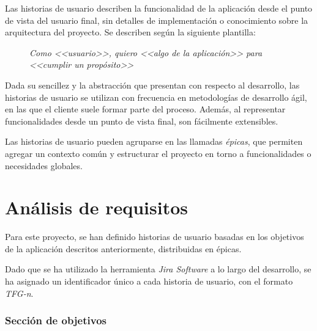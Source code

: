 \documentclass[10pt, a4paper]{aqademic}
\begin{document}
Las historias de usuario describen la funcionalidad de la aplicación desde el punto de vista del usuario final, sin detalles de implementación o conocimiento sobre la arquitectura del proyecto. Se describen según la siguiente plantilla:

\medskip

\begin{figure}[h]
	\centering
	\textit{Como <<usuario>>, quiero <<algo de la aplicación>> para <<cumplir un propósito>>}
\end{figure}

Dada su sencillez y la abstracción que presentan con respecto al desarrollo, las historias de usuario se utilizan con frecuencia en metodologías de desarrollo ágil, en las que el cliente suele formar parte del proceso. Además, al representar funcionalidades desde un punto de vista final, son fácilmente extensibles.

Las historias de usuario pueden agruparse en las llamadas \textit{épicas}, que permiten agregar un contexto común y estructurar el proyecto en torno a funcionalidades o necesidades globales.


\section{Análisis de requisitos}

Para este proyecto, se han definido historias de usuario basadas en los objetivos de la aplicación descritos anteriormente, distribuidas en épicas.

Dado que se ha utilizado la herramienta \textit{Jira Software} a lo largo del desarrollo, se ha asignado un identificador único a cada historia de usuario, con el formato \textit{TFG-n}.

\subsubsection*{Sección de objetivos}
\end{document}
